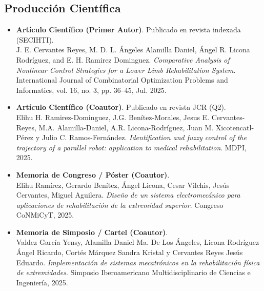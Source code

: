 \documentclass[a4paper,12pt]{article}
\begin{document}
\subsection{Producción Científica}
\begin{itemize}
    \item \textbf{Artículo Científico (Primer Autor)}. Publicado en revista indexada (SECIHTI). \\
          J. E. Cervantes Reyes, M. D. L. Ángeles Alamilla Daniel, Ángel R. Licona Rodríguez, and E. H. Ramirez Dominguez. \textit{Comparative Analysis of Nonlinear Control Strategies for a Lower Limb Rehabilitation System}. International Journal of Combinatorial Optimization Problems and Informatics, vol. 16, no. 3, pp. 36--45, Jul. 2025.

    \item \textbf{Artículo Científico (Coautor)}. Publicado en revista JCR (Q2). \\
          Elihu H. Ramirez-Dominguez, J.G. Benítez-Morales, Jesus E. Cervantes-Reyes, M.A. Alamilla-Daniel, A.R. Licona-Rodríguez, Juan M. Xicotencatl-Pérez y Julio C. Ramos-Fernández. \textit{Identification and fuzzy control of the trajectory of a parallel robot: application to medical rehabilitation}. MDPI, 2025.

    \item \textbf{Memoria de Congreso / Póster (Coautor)}. \\
          Elihu Ramírez, Gerardo Benítez, Ángel Licona, Cesar Vilchis, Jesús Cervantes, Miguel Aguilera. \textit{Diseño de un sistema electromecánico para aplicaciones de rehabilitación de la extremidad superior}. Congreso CoNMiCyT, 2025.

    \item \textbf{Memoria de Simposio / Cartel (Coautor)}. \\
          Valdez García Yensy, Alamilla Daniel Ma. De Los Ángeles, Licona Rodríguez Ángel Ricardo, Cortés Márquez Sandra Kristal y Cervantes Reyes Jesús Eduardo. \textit{Implementación de sistemas mecatrónicos en la rehabilitación física de extremidades}. Simposio Iberoamericano Multidisciplinario de Ciencias e Ingeniería, 2025.
\end{itemize}
\end{document}
